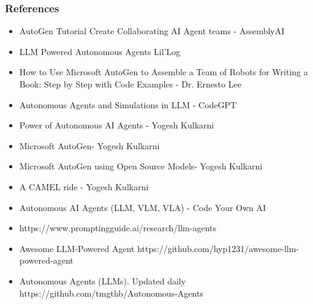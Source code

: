 \begin{frame}[fragile]\frametitle{References}
\begin{itemize}
\item AutoGen Tutorial Create Collaborating AI Agent teams - AssemblyAI
\item LLM Powered Autonomous Agents Lil'Log
\item How to Use Microsoft AutoGen to Assemble a Team of Robots for Writing a Book: Step by Step with Code Examples - Dr. Ernesto Lee
\item Autonomous Agents and Simulations in LLM - CodeGPT
\item Power of Autonomous AI Agents - Yogesh Kulkarni
\item Microsoft AutoGen- Yogesh Kulkarni
\item Microsoft AutoGen using Open Source Models- Yogesh Kulkarni
\item A CAMEL ride - Yogesh Kulkarni
\item Autonomous AI Agents (LLM, VLM, VLA) - Code Your Own AI
\item https://www.promptingguide.ai/research/llm-agents
\item Awesome LLM-Powered Agent https://github.com/hyp1231/awesome-llm-powered-agent
\item Autonomous Agents (LLMs). Updated daily https://github.com/tmgthb/Autonomous-Agents
\end{itemize}
\end{frame}